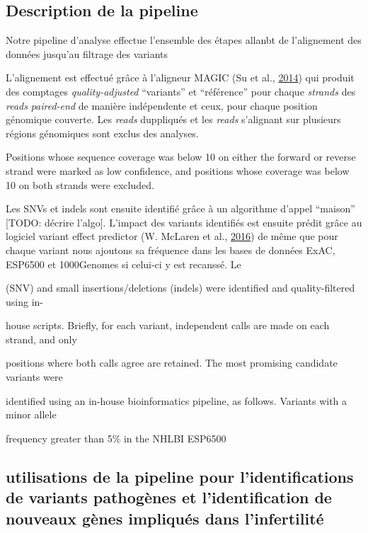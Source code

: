 \documentclass[12pt,twoside]{reedthesis}
\theoremstyle{definition}
\theoremstyle{definition}
\theoremstyle{remark}
\begin{document}
  \subsection{Description de la
  pipeline}\label{description-de-la-pipeline}
  
  Notre pipeline d'analyse effectue l'ensemble des étapes allanbt de
  l'alignement des données jusqu'au filtrage des variants
  
  L'alignement est effectué grâce à l'aligneur MAGIC (Su et al.,
  \protect\hyperlink{ref-Su2014}{2014}) qui produit des comptages
  \emph{quality-adjusted} ``variants'' et ``référence'' pour chaque
  \emph{strands} des \emph{reads} \emph{paired-end} de manière
  indépendente et ceux, pour chaque position génomique couverte. Les
  \emph{reads} duppliqués et les \emph{reads} s'alignant sur plusieurs
  régions génomiques sont exclus des analyses.
  
  Positions whose sequence coverage was below 10 on either the forward or
  reverse strand were marked as low confidence, and positions whose
  coverage was below 10 on both strands were excluded.
  
  Les SNVs et indels sont ensuite identifié grâce à un algorithme d'appel
  ``maison'' {[}TODO: décrire l'algo{]}. L'impact des variants identifiés
  est ensuite prédit grâce au logiciel variant effect predictor (W.
  McLaren et al., \protect\hyperlink{ref-McLaren2016}{2016}) de même que
  pour chaque variant nous ajoutons sa fréquence dans les bases de données
  ExAC, ESP6500 et 1000Genomes si celui-ci y est recanssé. Le
  
  (SNV) and small insertions/deletions (indels) were identified and
  quality-filtered using in-
  
  house scripts. Briefly, for each variant, independent calls are made on
  each strand, and only
  
  positions where both calls agree are retained. The most promising
  candidate variants were
  
  identified using an in-house bioinformatics pipeline, as follows.
  Variants with a minor allele
  
  frequency greater than 5\% in the NHLBI ESP6500
  
  \subsection{utilisations de la pipeline pour l'identifications de
  variants pathogènes et l'identification de nouveaux gènes impliqués dans
  l'infertilité}\label{utilisations-de-la-pipeline-pour-lidentifications-de-variants-pathogenes-et-lidentification-de-nouveaux-genes-impliques-dans-linfertilite}
  
\end{document}
